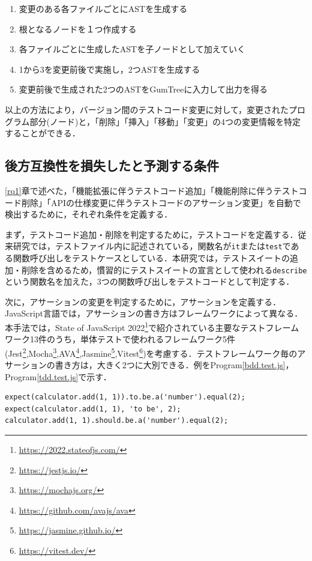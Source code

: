 \documentclass[11pt,dvipdfmx]{jreport}
\begin{document}
\begin{enumerate}
  \setlength{\itemsep}{0cm}
  \item 変更のある各ファイルごとにASTを生成する
  \item 根となるノードを１つ作成する
  \item 各ファイルごとに生成したASTを子ノードとして加えていく
  \item 1から3を変更前後で実施し，2つASTを生成する
  \item 変更前後で生成された2つのASTをGumTreeに入力して出力を得る
\end{enumerate}

以上の方法により，バージョン間のテストコード変更に対して，変更されたプログラム部分(ノード)と，「削除」「挿入」「移動」「変更」の4つの変更情報を特定することができる．

\subsection{後方互換性を損失したと予測する条件}\label{rq2nojouken}
\ref{rq1}章で述べた，「機能拡張に伴うテストコード追加」「機能削除に伴うテストコード削除」「APIの仕様変更に伴うテストコードのアサーション変更」を自動で検出するために，それぞれ条件を定義する．

まず，テストコード追加・削除を判定するために，テストコードを定義する．従来研究\cite{matsuda}では，テストファイル内に記述されている，関数名が{\verb|it|}または{\verb|test|}である関数呼び出しをテストケースとしている．本研究では，テストスイートの追加・削除を含めるため，慣習的にテストスイートの宣言として使われる{\verb|describe|}という関数名を加えた，3つの関数呼び出しをテストコードとして判定する．

次に，アサーションの変更を判定するために，アサーションを定義する．JavaScript言語では，アサーションの書き方はフレームワークによって異なる．本手法では，State of JavaScript 2022\footnote{\url{https://2022.stateofjs.com/}}で紹介されている主要なテストフレームワーク13件のうち，単体テストで使われるフレームワーク5件(Jest\footnote{\url{https://jestjs.io/}},Mocha\footnote{\url{https://mochajs.org/}},AVA\footnote{\url{https://github.com/avajs/ava}},Jasmine\footnote{\url{https://jasmine.github.io/}},Vitest\footnote{\url{https://vitest.dev/}})を考慮する．テストフレームワーク毎のアサーションの書き方は，大きく2つに大別できる．例をProgram\ref{bdd.test.js}，Program\ref{tdd.test.js}で示す．

\begin{lstlisting}[caption=アサーション例1, label=bdd.test.js]
expect(calculator.add(1, 1)).to.be.a('number').equal(2);
expect(calculator.add(1, 1), 'to be', 2);
calculator.add(1, 1).should.be.a('number').equal(2);
\end{lstlisting}
\end{document}
